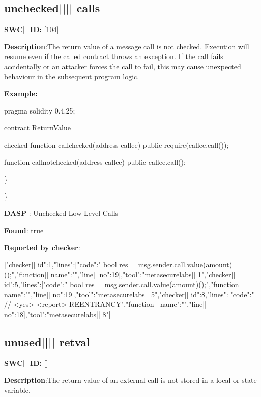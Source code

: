 \documentclass{article}
\begin{document}
\subsection{unchecked{||\textunderscore|| }calls} 
\textbf{SWC{|\textunderscore| }ID:} [104]

\textbf{Description}:The return value of a message call is not checked. Execution will resume even if the called contract throws an exception. If the call fails accidentally or an attacker forces the call to fail, this may cause unexpected behaviour in the subsequent program logic.


\textbf{Example:} 
\begin{ffcode} 

pragma solidity 0.4.25;

contract ReturnValue {

checked
function callchecked(address callee) public {
    require(callee.call());
  }

  function callnotchecked(address callee) public {
    callee.call();
  }
}

\end{ffcode} 
\} 

\} 

\textbf{DASP} : Unchecked Low Level Calls

\textbf{Found}: true

\textbf{Reported by checker}: 
\begin{ffcode} 

[{"checker|\textunderscore| id":1,"lines":[{"code":"      bool res = msg.sender.call.value(amount)();\n","function|\textunderscore| name":"","line|\textunderscore| no":19}],"tool":"metasecurelabs|\textendash| 1"},{"checker|\textunderscore| id":5,"lines":[{"code":"      bool res = msg.sender.call.value(amount)();\n","function|\textunderscore| name":"","line|\textunderscore| no":19}],"tool":"metasecurelabs|\textendash| 5"},{"checker|\textunderscore| id":8,"lines":[{"code":"      // <yes> <report> REENTRANCY\n","function|\textunderscore| name":"","line|\textunderscore| no":18}],"tool":"metasecurelabs|\textendash| 8"}]
\end{ffcode} 
\subsection{unused{||\textunderscore|| }retval} 
\textbf{SWC{|\textunderscore| }ID:} []

\textbf{Description}:The return value of an external call is not stored in a local or state variable.
\end{document}
